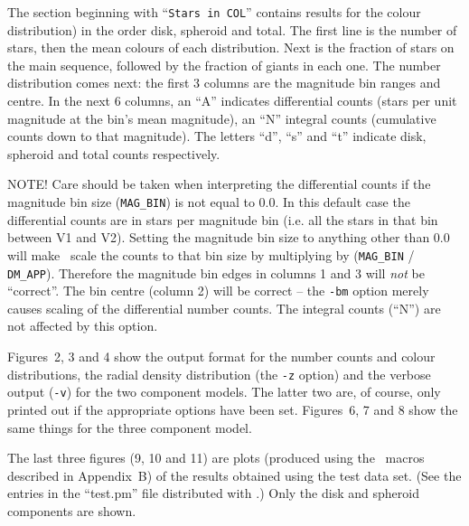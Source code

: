 \documentclass[11pt,twoside]{article}
\begin{document}
The section beginning with ``{\tt Stars in COL}'' contains results for the 
colour distribution) in the order disk, spheroid and total. The first line is 
the number of stars, then the mean colours of each distribution. Next is the 
fraction of stars on the main sequence, followed by the fraction of giants in
each one. The number distribution comes next: the first 3 columns are the 
magnitude bin ranges and centre. In the next 6 columns, an ``A'' indicates
differential counts (stars per unit magnitude at the bin's mean magnitude), an
``N'' integral counts (cumulative counts down to that magnitude). The letters 
``d'', ``s'' and ``t'' indicate disk, spheroid and total counts respectively.

NOTE! Care should be taken when interpreting the differential counts if the 
magnitude bin size ({\tt MAG\_BIN}) is not equal to 0.0. In this default case 
the differential counts are in stars per magnitude bin (i.e. all the stars in
that bin between V1 and V2). Setting the magnitude bin size to anything other 
than 0.0 will make \bsm\ scale the counts to that bin size by multiplying by 
({\tt MAG\_BIN} / {\tt DM\_APP}). Therefore the magnitude bin edges in columns 
1 and 3 will {\em not} be ``correct''. The bin centre (column 2) will be 
correct -- the {\tt -bm} option merely causes scaling of the differential 
number counts. The integral counts (``N'') are not affected by this option.

Figures~2, 3 and 4 show the output format for the number counts and colour 
distributions, the radial density distribution (the {\tt -z} option) and 
the verbose output ({\tt -v}) for the two component models. The latter two 
are, of course, only printed out if the appropriate options have been set. 
Figures~6, 7 and 8 show the same things for the three component model.

The last three figures (9, 10 and 11) are plots (produced using the \sm\ macros
described in Appendix~B) of the results obtained using the test data set. (See
the entries in the ``test.pm'' file distributed with \bsm.) Only the disk
and spheroid components are shown.
\end{document}

